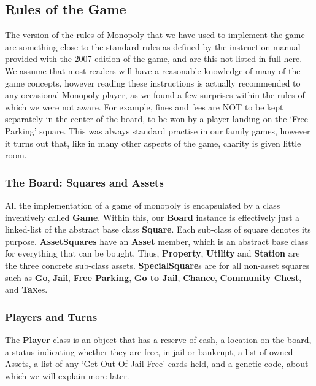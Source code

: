 \documentclass[11pt,a4paper,twocolumn]{scrartcl}
\begin{document}
\subsection{Rules of the Game}

The version of the rules of Monopoly that we have used to implement the game are something close to the standard rules as defined by the instruction manual provided with the 2007 edition of the game, and are this not listed in full here. We assume that most readers will have a reasonable knowledge of many of the game concepts, however reading these instructions is actually recommended to any occasional Monopoly player, as we found a few surprises within the rules of which we were not aware. For example, fines and fees are NOT to be kept separately in the center of the board, to be won by a player landing on the `Free Parking' square. This was always standard practise in our family games, however it turns out that, like in many other aspects of the game, charity is given little room.

\subsubsection{The Board: Squares and Assets}

All the implementation of a game of monopoly is encapsulated by a class inventively called \textbf{Game}. Within this, our \textbf{Board} instance is effectively just a linked-list of the abstract base class \textbf{Square}. Each sub-class of square denotes its purpose. \textbf{AssetSquares} have an \textbf{Asset} member, which is an abstract base class for everything that can be bought. Thus, \textbf{Property}, \textbf{Utility} and \textbf{Station} are the three concrete sub-class assets. \textbf{SpecialSquare}s are for all non-asset squares such as \textbf{Go}, \textbf{Jail}, \textbf{Free Parking}, \textbf{Go to Jail}, \textbf{Chance}, \textbf{Community Chest}, and \textbf{Tax}es.

\subsubsection{Players and Turns}

The \textbf{Player} class is an object that has a reserve of cash, a location on the board, a status indicating whether they are free, in jail or bankrupt, a list of owned Assets, a list of any `Get Out Of Jail Free' cards held, and a genetic code, about which we will explain more later.
\end{document}
